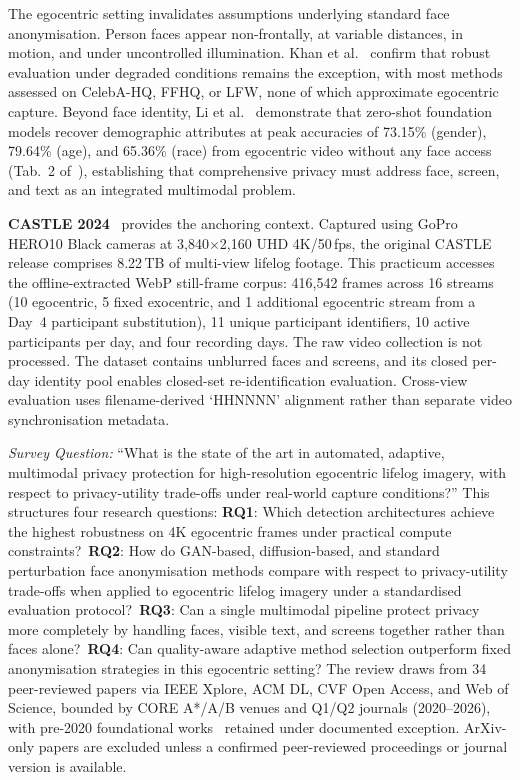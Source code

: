 \documentclass[10pt, twocolumn]{IEEEtran}
\begin{document}
The egocentric setting invalidates assumptions underlying standard face anonymisation. Person faces appear non-frontally, at variable distances, in motion, and under uncontrolled illumination. Khan et al.~\cite{khan2024survey} confirm that robust evaluation under degraded conditions remains the exception, with most methods assessed on CelebA-HQ, FFHQ, or LFW, none of which approximate egocentric capture. Beyond face identity, Li et al.~\cite{li2025egoprivacy} demonstrate that zero-shot foundation models recover demographic attributes at peak accuracies of 73.15\% (gender), 79.64\% (age), and 65.36\% (race) from egocentric video without any face access (Tab.~2 of~\cite{li2025egoprivacy}), establishing that comprehensive privacy must address face, screen, and text as an integrated multimodal problem.

\textbf{CASTLE 2024}~\cite{rossetto2025castle} provides the anchoring context. Captured using GoPro HERO10 Black cameras at 3,840$\times$2,160 UHD 4K/50\,fps, the original CASTLE release comprises 8.22\,TB of multi-view lifelog footage. This practicum accesses the offline-extracted WebP still-frame corpus: 416,542 frames across 16 streams (10 egocentric, 5 fixed exocentric, and 1 additional egocentric stream from a Day~4 participant substitution), 11 unique participant identifiers, 10 active participants per day, and four recording days. The raw video collection is not processed. The dataset contains unblurred faces and screens, and its closed per-day identity pool enables closed-set re-identification evaluation. Cross-view evaluation uses filename-derived `HHNNNN' alignment rather than separate video synchronisation metadata.

\textit{Survey Question:} ``What is the state of the art in automated, adaptive, multimodal privacy protection for high-resolution egocentric lifelog imagery, with respect to privacy-utility trade-offs under real-world capture conditions?'' This structures four research questions: \textbf{RQ1}: Which detection architectures achieve the highest robustness on 4K egocentric frames under practical compute constraints?\ \textbf{RQ2}: How do GAN-based, diffusion-based, and standard perturbation face anonymisation methods compare with respect to privacy-utility trade-offs when applied to egocentric lifelog imagery under a standardised evaluation protocol?\ \textbf{RQ3}: Can a single multimodal pipeline protect privacy more completely by handling faces, visible text, and screens together rather than faces alone?\ \textbf{RQ4}: Can quality-aware adaptive method selection outperform fixed anonymisation strategies in this egocentric setting? The review draws from 34 peer-reviewed papers via IEEE Xplore, ACM DL, CVF Open Access, and Web of Science, bounded by CORE A*/A/B venues and Q1/Q2 journals (2020--2026), with pre-2020 foundational works~\cite{deng2019arcface,baek2019craft,heusel2017fid,zhang2018lpips,wang2004ssim} retained under documented exception. ArXiv-only papers are excluded unless a confirmed peer-reviewed proceedings or journal version is available.
\end{document}
